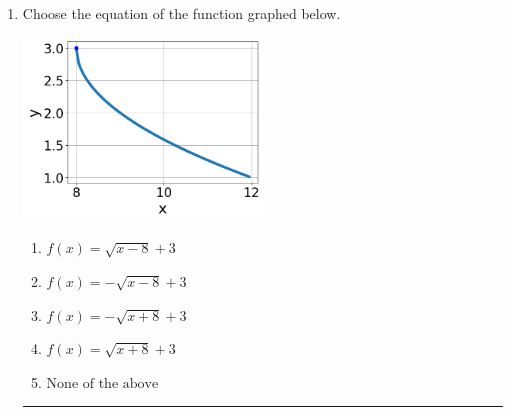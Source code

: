 \documentclass[14pt]{extbook}
\newcommand{\litem}[1]{\item#1\hspace*{-1cm}\rule{\textwidth}{0.4pt}}
\begin{document}
\begin{enumerate}
{\begin{enumerate}[label=\Alph*.]
\end{enumerate} }
\litem{
Choose the equation of the function graphed below.
\begin{center}
    \includegraphics[width=0.5\textwidth]{../Figures/radicalGraphToEquationCopyA.png}
\end{center}
\begin{enumerate}[label=\Alph*.]
\item \( f(x) = \sqrt{x - 8} + 3 \)
\item \( f(x) = - \sqrt{x - 8} + 3 \)
\item \( f(x) = - \sqrt{x + 8} + 3 \)
\item \( f(x) = \sqrt{x + 8} + 3 \)
\item \( \text{None of the above} \)


\end{enumerate}}
\end{enumerate}
\end{document}
